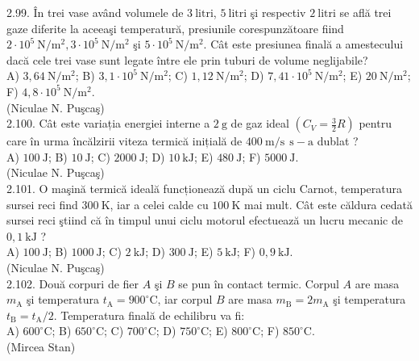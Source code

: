 2.99. În trei vase având volumele de $3 \mathrm{~litri}$, $5 \mathrm{~litri}$ şi respectiv $2 \mathrm{~litri}$ se află trei gaze diferite la aceeaşi temperatură, presiunile corespunzătoare fiind $2 \cdot 10^{5} \mathrm{~N} / \mathrm{m}^{2}, 3 \cdot 10^{5} \mathrm{~N} / \mathrm{m}^{2}$ şi $5 \cdot 10^{5} \mathrm{~N} / \mathrm{m}^{2}$. Cât este presiunea finală a amestecului dacă cele trei vase sunt legate între ele prin tuburi de volume neglijabile?\\ A) $3,64 \mathrm{~N} / \mathrm{m}^{2}$; B) $3,1 \cdot 10^{5} \mathrm{~N} / \mathrm{m}^{2}$; C) $1,12 \mathrm{~N} / \mathrm{m}^{2}$; D) $7,41 \cdot 10^{5} \mathrm{~N} / \mathrm{m}^{2}$; E) $20 \mathrm{~N} / \mathrm{m}^{2}$; F) $4,8 \cdot 10^{5} \mathrm{~N} / \mathrm{m}^{2}$.\\ (Niculae N. Puşcaş)\\

2.100. Cât este variația energiei interne a $2 \mathrm{~g}$ de gaz ideal $\left(C_{V}=\frac{3}{2} R\right)$ pentru care în urma încălzirii viteza termică inițială de $400 \mathrm{~m} / \mathrm{s} ~ \mathrm{~s}-\mathrm{a}$ dublat ?\\ A) $100 \mathrm{~J}$; B) $10 \mathrm{~J}$; C) $2000 \mathrm{~J}$; D) $10 \mathrm{~kJ}$; E) $480 \mathrm{~J}$; F) $5000 \mathrm{~J}$.\\ (Niculae N. Puşcaş)\\

2.101. O maşină termică ideală funcționează după un ciclu Carnot, temperatura sursei reci find $300 \mathrm{~K}$, iar a celei calde cu $100 \mathrm{~K}$ mai mult. Cât este căldura cedată sursei reci ştiind că în timpul unui ciclu motorul efectuează un lucru mecanic de $0,1 \mathrm{~kJ}$ ?\\ A) $100 \mathrm{~J}$; B) $1000 \mathrm{~J}$; C) $2 \mathrm{~kJ}$; D) $300 \mathrm{~J}$; E) $5 \mathrm{~kJ}$; F) $0,9 \mathrm{~kJ}$.\\ (Niculae N. Puşcaş)\\

2.102. Două corpuri de fier $A$ şi $B$ se pun în contact termic. Corpul $A$ are masa $m_{\mathrm{A}}$ şi temperatura $t_{\mathrm{A}}=900^{\circ} \mathrm{C}$, iar corpul $B$ are masa $m_{\mathrm{B}}=2 m_{\mathrm{A}}$ şi temperatura $t_{\mathrm{B}}=t_{\mathrm{A}} / 2$. Temperatura finală de echilibru va fi:\\ A) $600^{\circ} \mathrm{C}$; B) $650^{\circ} \mathrm{C}$; C) $700^{\circ} \mathrm{C}$; D) $750^{\circ} \mathrm{C}$; E) $800^{\circ} \mathrm{C}$; F) $850^{\circ} \mathrm{C}$.\\ (Mircea Stan)\\

